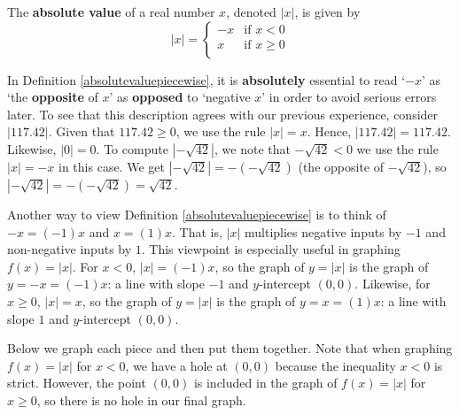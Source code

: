 \documentclass{ximera}
\begin{document}
\medskip


\begin{definition}

\label{absolutevaluepiecewise}

The \textbf{absolute value} of a real number $x$, denoted $|x|$, is given by \[ |x| =  \begin{cases} 
      -x &  \text{if $x < 0$} \\
      x & \text{if $x \geq 0$} \\
   \end{cases} \]

\end{definition}


\medskip

In Definition \ref{absolutevaluepiecewise}, it is \textbf{absolutely} essential to read `$-x$' as `the \textbf{opposite} of $x$' as \textbf{opposed} to `negative $x$' in order to avoid serious errors later.  To see that this description agrees with our previous experience, consider $|117.42|$.  Given that $117.42 \geq 0$, we use the rule $|x| = x$.  Hence, $|117.42| = 117.42$.  Likewise, $|0| = 0$.  To compute $|-\sqrt{42}|$, we note that $-\sqrt{42} < 0$ we use the rule $|x| = -x$ in this case.  We get $|-\sqrt{42}| = -(-\sqrt{42})$ (the opposite of $-\sqrt{42}$), so $|-\sqrt{42}| = -(-\sqrt{42}) = \sqrt{42}$.   

\medskip

Another way to view Definition \ref{absolutevaluepiecewise} is to think of $-x = (-1)x$ and $x = (1)x$.  That is,   $|x|$ multiplies negative inputs by $-1$ and  non-negative inputs by $1$.    This viewpoint is especially useful in graphing  $f(x) = |x|$.  For $x<0$,  $|x| = (-1)x$, so the graph of $y = |x|$ is the graph of  $y = -x = (-1) x$:  a line with slope $-1$ and $y$-intercept $(0,0)$.   Likewise, for $x \geq 0$, $|x| = x$, so the graph of $y = |x|$ is the graph of $y = x = (1)x$:  a line with slope $1$ and $y$-intercept $(0,0)$.  

\medskip

Below we graph each piece and then put them together. Note that when graphing $f(x) = |x|$ for $x < 0$, we have a hole at $(0, 0)$ because the inequality $x < 0$ is strict. However, the point $(0, 0)$ is included in the graph of $f(x) = |x|$ for $x \geq 0$, so there is no hole in our final graph.
\end{document}
